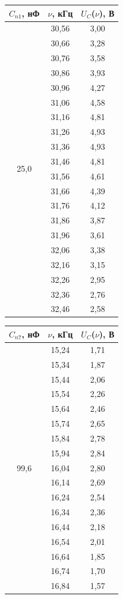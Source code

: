 \documentclass[a4paper,12pt]{article}
\begin{document}
\begin{tabular}{|c|c|c|}
\hline
$C_{n1}$, нФ & $\nu$, кГц & $U_C$($\nu$), В \\
\hline
\multirow{20}{*}{25,0} & 30,56 & 3,00 \\
\cline{2-3} & 30,66 & 3,28 \\
\cline{2-3} & 30,76 & 3,58 \\
\cline{2-3} & 30,86 & 3,93 \\
\cline{2-3} & 30,96 & 4,27 \\
\cline{2-3} & 31,06 & 4,58 \\
\cline{2-3} & 31,16 & 4,81 \\
\cline{2-3} & 31,26 & 4,93 \\
\cline{2-3} & 31,36 & 4,93 \\
\cline{2-3} & 31,46 & 4,81 \\
\cline{2-3} & 31,56 & 4,61 \\
\cline{2-3} & 31,66 & 4,39 \\
\cline{2-3} & 31,76 & 4,12 \\
\cline{2-3} & 31,86 & 3,87 \\
\cline{2-3} & 31,96 & 3,61 \\
\cline{2-3} & 32,06 & 3,38 \\
\cline{2-3} & 32,16 & 3,15 \\
\cline{2-3} & 32,26 & 2,95 \\
\cline{2-3} & 32,36 & 2,76 \\
\cline{2-3} & 32,46 & 2,58 \\
\hline
\end{tabular}
\qquad
\begin{tabular}{|c|c|c|}
\hline
$C_{n7}$, нФ & $\nu$, кГц & $U_C$($\nu$), В \\
\hline
\multirow{17}{*}{99,6} & 15,24 & 1,71 \\
\cline{2-3} & 15,34 & 1,87 \\
\cline{2-3} & 15,44 & 2,06 \\
\cline{2-3} & 15,54 & 2,26 \\
\cline{2-3} & 15,64 & 2,46 \\
\cline{2-3} & 15,74 & 2,65 \\
\cline{2-3} & 15,84 & 2,78 \\
\cline{2-3} & 15,94 & 2,84 \\
\cline{2-3} & 16,04 & 2,80 \\
\cline{2-3} & 16,14 & 2,69 \\
\cline{2-3} & 16,24 & 2,54 \\
\cline{2-3} & 16,34 & 2,36 \\
\cline{2-3} & 16,44 & 2,18 \\
\cline{2-3} & 16,54 & 2,01 \\
\cline{2-3} & 16,64 & 1,85 \\
\cline{2-3} & 16,74 & 1,70 \\
\cline{2-3} & 16,84 & 1,57 \\
\hline
\end{tabular}
\end{document}
